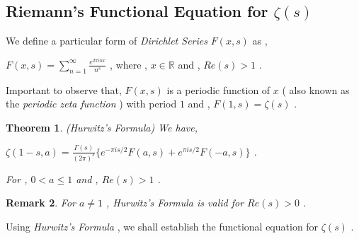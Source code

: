\documentclass[article,12pt]{elsarticle}
\newtheorem{thm}{Theorem}[section]
\newtheorem{rmk}[thm]{Remark}
\begin{document}
	\subsection{Riemann's Functional Equation for $\zeta(s)$}
	We define a particular form of \textit{Dirichlet Series} $F(x,s)$ as , 
	\begin{center}
		$	F(x,s)=\sum\limits_{n=1}^{\infty}\frac{{e}^{2\pi inx}}{{n}^{s}}$  , \hspace{10pt} where , $x\in \mathbb{R}$  \hspace{10pt} and ,\hspace{10pt} $Re(s)>1$ .
	\end{center}
	Important to observe that, $F(x,s)$ is a periodic function of $x$ ( also known as the \textit{periodic zeta function} ) with period $1$ \hspace{10pt} and , \hspace{10pt} $F(1,s)=\zeta(s)$ . 
	\begin{thm}
		(Hurwitz's Formula) We have,
		\begin{center}
			$\zeta(1-s,a)=\frac{\Gamma(s)}{{(2\pi)}^{s}}\{{e}^{-\pi is/2}F(a,s)+{e}^{\pi is/2}F(-a,s)\}$ .
		\end{center}
		For , $0<a\leq 1$  and , $Re(s)>1$ .
	\end{thm}
	\begin{rmk}
		For $a\neq 1$ , \textit{Hurwitz's Formula} is valid for $Re(s)>0$ .
	\end{rmk}
	Using \textit{Hurwitz's Formula} , we shall establish the functional equation for $\zeta(s)$ .	
	
\end{document}

